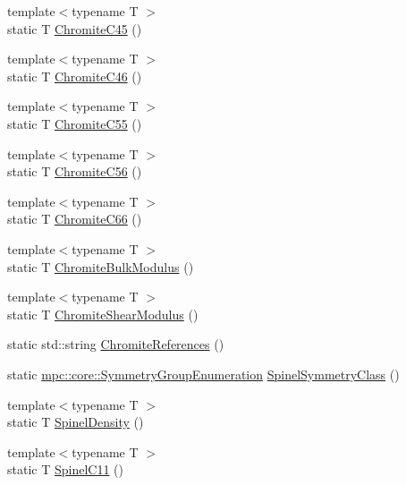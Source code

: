 \begin{DoxyCompactItemize}
\item 
{\footnotesize template$<$typename T $>$ }\\static T \mbox{\hyperlink{namespacempc_1_1data_a167bae3036ca89864ae4ebb4ba87c721}{Chromite\+C45}} ()
\item 
{\footnotesize template$<$typename T $>$ }\\static T \mbox{\hyperlink{namespacempc_1_1data_a33a011775e2eba3965f0bd0a1ac40bff}{Chromite\+C46}} ()
\item 
{\footnotesize template$<$typename T $>$ }\\static T \mbox{\hyperlink{namespacempc_1_1data_a355922ba7af624c921fad5d805545bac}{Chromite\+C55}} ()
\item 
{\footnotesize template$<$typename T $>$ }\\static T \mbox{\hyperlink{namespacempc_1_1data_ae19342af78f328c1fa5a25eb8d8d2434}{Chromite\+C56}} ()
\item 
{\footnotesize template$<$typename T $>$ }\\static T \mbox{\hyperlink{namespacempc_1_1data_a27f6c33b6f27e916d1dba354e1bc9313}{Chromite\+C66}} ()
\item 
{\footnotesize template$<$typename T $>$ }\\static T \mbox{\hyperlink{namespacempc_1_1data_acc40bbee4a24bcf677ea75af0b0d38b4}{Chromite\+Bulk\+Modulus}} ()
\item 
{\footnotesize template$<$typename T $>$ }\\static T \mbox{\hyperlink{namespacempc_1_1data_a6218c8e6fd3dbfac80bbaccad7e5fd44}{Chromite\+Shear\+Modulus}} ()
\item 
static std\+::string \mbox{\hyperlink{namespacempc_1_1data_a8ea68f6ebec0caf66845e442548f74aa}{Chromite\+References}} ()
\item 
static \mbox{\hyperlink{namespacempc_1_1core_a9d979684062547055a0ef5c13077bad8}{mpc\+::core\+::\+Symmetry\+Group\+Enumeration}} \mbox{\hyperlink{namespacempc_1_1data_af9f4c7d0fb0848abec9e09e956226405}{Spinel\+Symmetry\+Class}} ()
\item 
{\footnotesize template$<$typename T $>$ }\\static T \mbox{\hyperlink{namespacempc_1_1data_a01c1437a39fe7e85a683cded4e66444c}{Spinel\+Density}} ()
\item 
{\footnotesize template$<$typename T $>$ }\\static T \mbox{\hyperlink{namespacempc_1_1data_a8aacfda816418a9bc1ab2f929dd07d6a}{Spinel\+C11}} ()
\item 

\end{DoxyCompactItemize}
